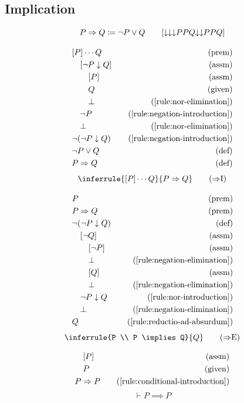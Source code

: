 \subsection{Implication}

\newcommand{\norimplies}[2]{\norvee{\norneg{#1}}{#2}} %
\begin{notation}
    \[P \implies Q \coloneqq \neg P \vee Q \qquad [\norimplies{P}{Q}]\]
\end{notation}

\begin{align*}
    \premise{[P] \cdots Q}\\
    \assumption[1]{\neg P \nor Q}\\
    \assumption[2]{P}\\
    \byrule[2]{Q}{\text{given}}\\
    \byrule[2]{\bot}{\ref{rule:nor-elimination}}\\
    \byrule[1]{\neg P}{\ref{rule:negation-introduction}}\\
    \byrule[1]{\bot}{\ref{rule:nor-elimination}}\\
    \byrule{\neg(\neg P \nor Q)}{\ref{rule:negation-introduction}}\\
    \bydefinition{\neg P \vee Q}\\
    \bydefinition{P \implies Q}
\end{align*}
\begin{equation}
    \inferrule{[P] \cdots Q}{P \implies Q}
    \tag{{$\implies$}I}
    \label{rule:conditional-introduction}
\end{equation}

\begin{align*}
    \premise{P}\\
    \premise{P \implies Q}\\
    \bydefinition{\neg(\neg P \nor Q)}\\
    \assumption[1]{\neg Q}\\
    \assumption[2]{\neg P}\\
    \byrule[2]{\bot}{\ref{rule:negation-elimination}}\\
    \assumption[2]{Q}\\
    \byrule[2]{\bot}{\ref{rule:negation-elimination}}\\
    \byrule[1]{\neg P \nor Q}{\ref{rule:nor-introduction}}\\
    \byrule[1]{\bot}{\ref{rule:negation-elimination}}\\
    \byrule{Q}{\ref{rule:reductio-ad-absurdum}}
\end{align*}
\begin{equation}
    \inferrule{P \\ P \implies Q}{Q}
    \tag{{$\implies$}E}
    \label{rule:conditional-elimination}
\end{equation}

\begin{align*}
    \assumption[1]{P}\\
    \given[1]{P}\\
    \byrule{P \implies P}{\ref{rule:conditional-introduction}}    
\end{align*}
\begin{equation}
    \vdash P \implies P
    \label{rule:conditional-reflexivity}
\end{equation}

